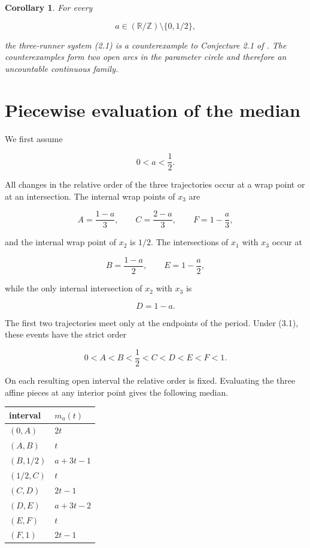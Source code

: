 \documentclass[11pt]{article}
\newtheorem{corollary}[theorem]{Corollary}
\numberwithin{equation}{section}
\begin{document}
\Needspace{0.25\textheight}
\begin{corollary}

For every

\nopagebreak[4]
\[
a\in(\mathbb R/\mathbb Z)\setminus\{0,1/2\},
\]

the three-runner system (2.1) is a counterexample to Conjecture 2.1 of \cite{aim2015}.
The counterexamples form two open arcs in the parameter circle and therefore
an uncountable continuous family.

\end{corollary}

\section{Piecewise evaluation of the median}


We first assume

\nopagebreak[4]
\[
0<a<\frac12.
\tag{3.1}
\]

All changes in the relative order of the three trajectories occur at a wrap
point or at an intersection. The internal wrap points of $x_3$ are

\nopagebreak[4]
\[
A=\frac{1-a}{3},\qquad
C=\frac{2-a}{3},\qquad
F=1-\frac a3,
\]

and the internal wrap point of $x_2$ is $1/2$. The intersections of $x_1$
with $x_3$ occur at

\nopagebreak[4]
\[
B=\frac{1-a}{2},\qquad E=1-\frac a2,
\]

while the only internal intersection of $x_2$ with $x_3$ is

\nopagebreak[4]
\[
D=1-a.
\]

The first two trajectories meet only at the endpoints of the period. Under
(3.1), these events have the strict order

\nopagebreak[4]
\[
0<A<B<\frac12<C<D<E<F<1.
\tag{3.2}
\]

On each resulting open interval the relative order is fixed. Evaluating the
three affine pieces at any interior point gives the following median.

\begin{center}
\begin{tabular}{ll}
\toprule
interval & $m_a(t)$ \\
\midrule
$(0,A)$ & $2t$ \\
$(A,B)$ & $t$ \\
$(B,1/2)$ & $a+3t-1$ \\
$(1/2,C)$ & $t$ \\
$(C,D)$ & $2t-1$ \\
$(D,E)$ & $a+3t-2$ \\
$(E,F)$ & $t$ \\
$(F,1)$ & $2t-1$ \\
\bottomrule
\end{tabular}
\end{center}
\end{document}
